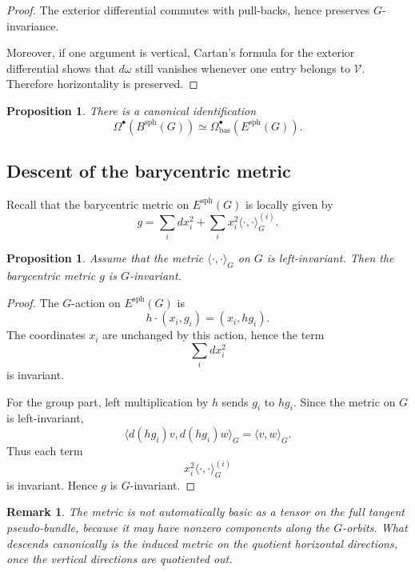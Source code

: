 \documentclass[11pt]{amsart}
\newtheorem{proposition}[definition]{Proposition}
\newtheorem{remark}[definition]{Remark}
\begin{document}
\begin{proof}
The exterior differential commutes with pull-backs, hence preserves
\(G\)-invariance.

Moreover, if one argument is vertical, Cartan's formula for the exterior
differential shows that \(d\omega\) still vanishes whenever one entry belongs to
\(\mathcal V\). Therefore horizontality is preserved.
\end{proof}

\begin{proposition}
There is a canonical identification
\[
\Omega^\bullet(B^{\mathrm{sph}}(G))
\simeq
\Omega^\bullet_{\mathrm{bas}}(E^{\mathrm{sph}}(G)).
\]
\end{proposition}

\subsection{Descent of the barycentric metric}

Recall that the barycentric metric on \(E^{\mathrm{sph}}(G)\) is locally given by
\[
g
=
\sum_i dx_i^2
+
\sum_i x_i^2 \langle \cdot,\cdot\rangle_G^{(i)}.
\]

\begin{proposition}
Assume that the metric \(\langle\cdot,\cdot\rangle_G\) on \(G\) is left-invariant. Then the barycentric metric \(g\) is \(G\)-invariant.
\end{proposition}

\begin{proof}
The \(G\)-action on \(E^{\mathrm{sph}}(G)\) is
\[
h\cdot (x_i,g_i)=(x_i,hg_i).
\]
The coordinates \(x_i\) are unchanged by this action, hence the term
\[
\sum_i dx_i^2
\]
is invariant.

For the group part, left multiplication by \(h\) sends \(g_i\) to \(hg_i\). Since the metric on \(G\) is left-invariant,
\[
\langle d(hg_i)v,d(hg_i)w\rangle_G
=
\langle v,w\rangle_G.
\]
Thus each term
\[
x_i^2\langle\cdot,\cdot\rangle_G^{(i)}
\]
is invariant. Hence \(g\) is \(G\)-invariant.
\end{proof}

\begin{remark}
The metric is not automatically basic as a tensor on the full tangent pseudo-bundle, because it may have nonzero components along the \(G\)-orbits. What descends canonically is the induced metric on the quotient horizontal directions, once the vertical directions are quotiented out.
\end{remark}
\end{document}
